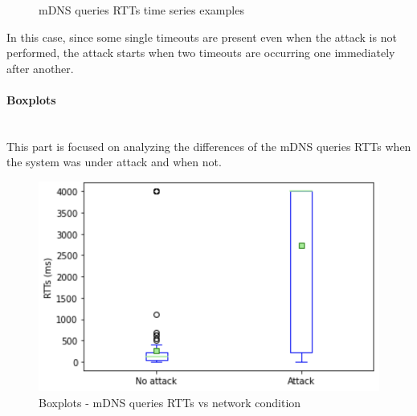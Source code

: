 \documentclass[fleqn, 11pt]{SelfArx} %
\begin{document}
\begin{figure}[H]
    \centering
    \qquad
    \caption{mDNS queries RTTs time series examples}%
    \label{fig:mdns-rtts-time-series}%
\end{figure}

In this case, since some single timeouts are present even when the attack is not performed, the attack starts when two timeouts are occurring one immediately after another. 

\paragraph{Boxplots}\mbox{}\\
This part is focused on analyzing the differences of the mDNS queries RTTs when the system was under attack and when not.
\begin{figure}[H]\centering
    \includegraphics[width=\linewidth]{./mdns/mdns-boxplot1.png}
    \caption{Boxplots - mDNS queries RTTs vs network condition}
\end{figure}
\end{document}
